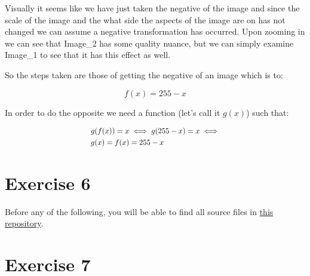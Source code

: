 \documentclass[12pt, a4paper]{article}
\begin{document}
\begin{multicols}{2}
    \begin{table}[H]
        \caption{Comparison of Image\_1 and Image\_2}\label{tab:comparison}
        \begin{center}
        \end{center}
    \end{table}

    Visually it seems like we have just taken the negative of the image and since the scale of the image and the what side the aspects of the image are on has not changed we can assume a negative transformation has occurred. Upon zooming in we can see that Image\_2 has some quality nuance, but we can simply examine Image\_1 to see that it has this effect as well.
    \newline

    So the steps taken are those of getting the negative of an image which is to: 
    \newline

    \[f(x) = 255 - x\]
    \newline

    In order to do the opposite we need a function (let's call it $g(x)$) such that:
    \newline

    \[
        \resizebox{0.45\textwidth}{!}{$
        \begin{aligned}
            & g(f(x)) = x \iff g(255 - x) = x \iff \\
            & g(x) = f(x) = 255 - x
        \end{aligned}
        $}
    \]
    \newline

    \section{Exercise 6} \label{sec:ex6}

    Before any of the following, you will be able to find all source files in \href{https://github.com/ArisPodotas/Image-Processing-EX1/tree/master}{this repository}.
    \newline

    \section{Exercise 7} \label{sec:ex7}

    \printbibliography

\end{multicols}
\end{document}
